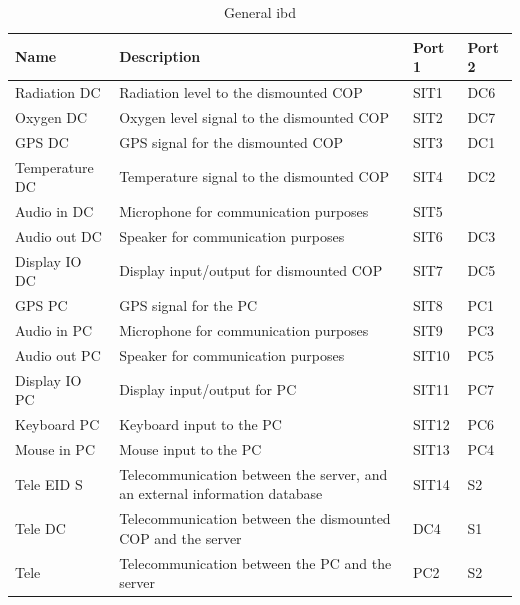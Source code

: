 \begin{table}[H]  
\centering

\begin{tabular}{|l|p{8cm}|l|l|} 
\hline
	\textbf{Name}		& \textbf{Description}						  & \textbf{Port 1} & \textbf{Port 2} \\\hline
  Radiation DC				&  Radiation level to the dismounted COP 	 					   & SIT1 & DC6 \\\hline
  Oxygen DC					&  Oxygen level signal to the dismounted COP				   & SIT2 & DC7 \\\hline
  GPS DC					&  GPS signal for the dismounted COP 	 					   & SIT3 & DC1 \\\hline   
  Temperature DC			&  Temperature signal to the dismounted COP 	 					   & SIT4 & DC2 \\\hline     
  Audio in DC				&  Microphone for communication purposes 	 				   & SIT5 &\fxfatal{DC8  FIX PÅ DIAGRAM!!!!!}\\\hline     
  Audio out DC				&  Speaker for communication purposes 	 					   & SIT6 & DC3 \\\hline     
  Display IO DC				&  Display input/output for dismounted COP 	 					   & SIT7 & DC5 \\\hline     
  
  GPS PC					&  GPS signal for the PC			 	 					   & SIT8 & PC1 \\\hline     
  Audio in PC				&  Microphone for communication purposes 	 					   & SIT9 & PC3 \\\hline     
  Audio out PC				&  Speaker for communication purposes 	 					   & SIT10 & PC5 \\\hline     
  Display IO PC				&  Display input/output for PC 	 					   & SIT11 & PC7 \\\hline     
  Keyboard PC				&  Keyboard input to the PC 	 					   & SIT12 & PC6 \\\hline     
  Mouse in PC				&  Mouse input to the PC 	 					   & SIT13 & PC4 \\\hline    
  Tele EID S				&  Telecommunication between the server, and an external information database				   & SIT14 & S2 \\\hline
       
  Tele DC					&  Telecommunication between the dismounted COP and the server & DC4 & S1 \\\hline   
  Tele 						&  Telecommunication between the PC and the server 					   & PC2 & S2 \\\hline   
   
\end{tabular}
\caption {General ibd} 
\end{table} 




